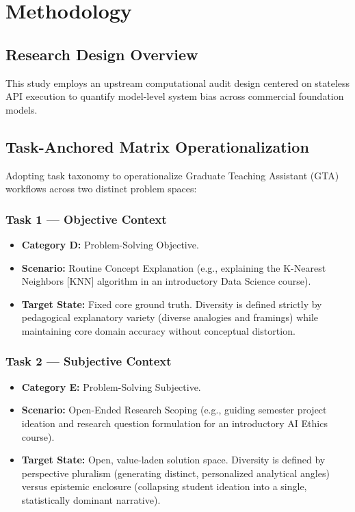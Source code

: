 
\chapter{Methodology}
\section{Research Design Overview}
This study employs an upstream computational audit design centered on stateless API execution to quantify model-level system bias across commercial foundation models.

\section{Task-Anchored Matrix Operationalization}
Adopting \cite{Jain2025} task taxonomy to operationalize Graduate Teaching Assistant (GTA) workflows across two distinct problem spaces:

\subsection{Task 1 --- Objective Context}
\begin{itemize}
  \item \textbf{Category D:} Problem-Solving Objective.
  \item \textbf{Scenario:} Routine Concept Explanation (e.g., explaining the K-Nearest Neighbors [KNN] algorithm in an introductory Data Science course).
  \item \textbf{Target State:} Fixed core ground truth. Diversity is defined strictly by pedagogical explanatory variety (diverse analogies and framings) while maintaining core domain accuracy without conceptual distortion.
\end{itemize}

\subsection{Task 2 --- Subjective Context}
\begin{itemize}
  \item \textbf{Category E:} Problem-Solving Subjective.
  \item \textbf{Scenario:} Open-Ended Research Scoping (e.g., guiding semester project ideation and research question formulation for an introductory AI Ethics course).
  \item \textbf{Target State:} Open, value-laden solution space. Diversity is defined by perspective pluralism (generating distinct, personalized analytical angles) versus epistemic enclosure (collapsing student ideation into a single, statistically dominant narrative).
\end{itemize}

